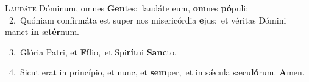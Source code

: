 \lettrine{\initial\textcolor{\initialcolor}{L}}{audáte} Dóminum, omnes \textbf{Gen}\-tes:~\star laudáte eum, \textbf{om}\-nes \textbf{pó}\-puli:\\
{\numbfont\textcolor{\numbcolor}{~2.}}~Quóniam confirmáta est super nos misericórdia \textbf{e}\-jus:~\star et véritas Dómini manet \textbf{in} æ\-\textbf{tér}\-num.\par
{\numbfont\textcolor{\numbcolor}{~3.}}~Glória Patri, et \textbf{Fí}\-lio,~\star et Spi\-\textbf{rí}\-tui \textbf{Sanc}\-to.\par
{\numbfont\textcolor{\numbcolor}{~4.}}~Sicut erat in princípio, et nunc, et \textbf{sem}\-per,~\star et in sǽcula sæcu\-\textbf{ló}\-rum. \textbf{A}\-men.\par
